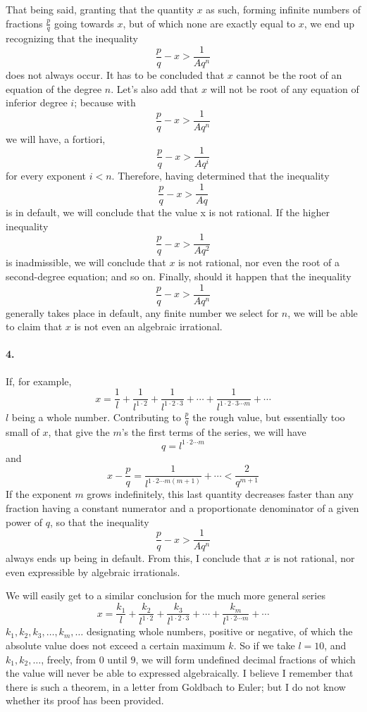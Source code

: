 \documentclass{article}
\begin{document}
That being said, granting that the quantity $x$ as such, forming infinite
numbers of fractions $\frac{p}{q}$ going towards $x$, but of which none are
exactly equal to $x$, we end up recognizing that the inequality
  $$\frac{p}{q} - x > \frac{1}{Aq^n}$$
does not always occur. It has to be concluded that $x$ cannot be the root of
an equation of the degree $n$. Let’s also add that $x$ will not be root of any
equation of inferior degree $i$; because with
  $$\frac{p}{q} - x > \frac{1}{Aq^n}$$
we will have, a fortiori,
  $$\frac{p}{q} - x > \frac{1}{Aq^i}$$
for every exponent $i < n$. Therefore, having determined that the inequality
  $$\frac{p}{q} - x > \frac{1}{Aq}$$
is in default, we will conclude that the value x is not rational. If the higher
inequality
  $$\frac{p}{q} - x > \frac{1}{Aq^2}$$
is inadmissible, we will conclude that $x$ is not rational, nor even the root
of a second-degree equation; and so on. Finally, should it happen that the
inequality
  $$\frac{p}{q} - x > \frac{1}{Aq^n}$$
generally takes place in default, any finite number we select for $n$, we will
be able to claim that $x$ is not even an algebraic irrational.

\paragraph{4.}
If, for example,
  $$x = \frac{1}{l} + \frac{1}{l^{1 \cdot 2}} + \frac{1}{l^{1\cdot 2\cdot 3}}
    + \cdots + \frac{1}{l^{1\cdot 2\cdot 3\cdots m}} + \cdots$$
$l$ being a whole number. Contributing to $\frac{p}{q}$ the rough value, but
essentially too small of $x$, that give the $m$’s the first terms of the series,
we will have
  $$q = l^{1\cdot 2\cdots m}$$
and
  $$x - \frac{p}{q} = \frac{1}{l^{1\cdot 2\cdots m(m + 1)}} + \cdots
  < \frac{2}{q^{m+1}}$$
If the exponent $m$ grows indefinitely, this last quantity decreases faster
than any fraction having a constant numerator and a proportionate denominator of
a given power of $q$, so that the inequality
  $$\frac{p}{q} - x > \frac{1}{Aq^n}$$
always ends up being in default. From this, I conclude that $x$ is not rational,
nor even expressible by algebraic irrationals.

We will easily get to a similar conclusion for the much more general series
  $$x = \frac{k_1}{l} + \frac{k_2}{l^{1\cdot 2}} + \frac{k_3}{l^{1\cdot 2\cdot 3}}
    + \cdots + \frac{k_m}{l^{1\cdot 2\cdots m}} + \cdots$$
$k_1, k_2, k_3, \ldots, k_m, \ldots$ designating whole numbers, positive or
negative, of which the absolute value does not exceed a certain maximum $k$.
So if we take $l = 10$, and $k_1, k_2, \ldots$, freely, from $0$ until $9$,
we will form undefined decimal fractions of which the value will never be able
to expressed algebraically. I believe I remember that there is such a theorem,
in a letter from Goldbach to Euler; but I do not know whether its proof has
been provided.
\end{document}
